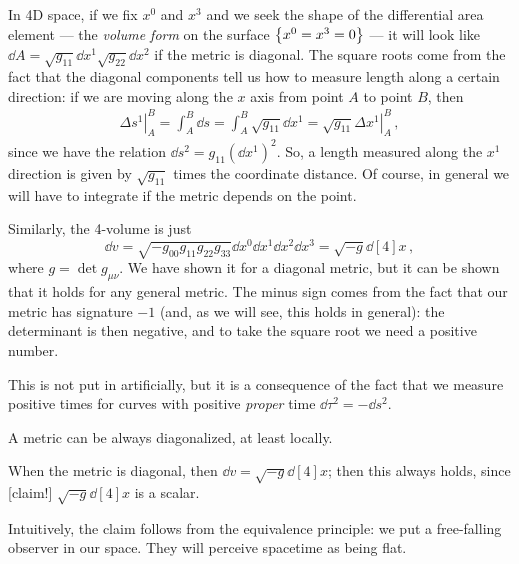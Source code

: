 \documentclass[main.tex]{subfiles}
\begin{document}
In 4D space, if we fix \(x^{0}\) and \(x^{3}\) and we seek the shape of the differential area element --- the \emph{volume form}  on  the surface \(\qty{x^{0} = x^{3}=0}\) --- it will look like \(\dd{A} = \sqrt{g_{11}} \dd{x^{1}} \sqrt{g_{22}} \dd{x^{2}} \) if the metric is diagonal. 
The square roots come from the fact that the diagonal components tell us how to measure length along a certain direction: if we  are moving along the \(x\) axis from point \(A\) to point \(B\), then
%
\begin{align}
\left. \Delta s^{1} \right\vert_{A}^{B} = \int_{A}^{B} \dd{s} = \int_{A}^{B} \sqrt{g_{11}} \dd{x^{1}} = \sqrt{g_{11} }  \left. \Delta x^{1} \right\vert_{A}^{B}
\,,
\end{align}
%
since we have the relation \(\dd{s^2} = g_{11} (\dd{x^{1}})^2\). 
So, a length measured along the \(x^{1}\) direction is given by \(\sqrt{g_{11} }\) times the coordinate distance. Of course, in general we will have to integrate if the metric depends on the point.

Similarly, the 4-volume is just 
%
\begin{equation}
  \dd{v} 
  = \sqrt{-g_{00}g_{11}g_{22}g_{33}}
  \dd{x^{0}} \dd{x^{1}} \dd{x^{2}} \dd{x^{3}} 
  = \sqrt{-g}
  \dd[4]{x} 
\,,
\end{equation}
%
where \(g = \det g_{\mu \nu }\). We have shown it for a diagonal metric, but it can be shown that it holds for any general metric. The minus sign comes from the fact that our metric has signature \(-1\) (and, as we will see, this holds in general): the determinant is then negative, and to take the square root we need a positive number.

This is not put in artificially, but it is a consequence of the fact that we measure positive times for curves with positive \emph{proper} time \(\dd{\tau^2} = - \dd{s^2}\).  

\begin{claim}[Unproven]
    A metric can be always diagonalized, at least locally.
\end{claim}

When the metric is diagonal, then \(\dd{v} = \sqrt{-g} \dd[4]{x} \); then this always holds, since [claim!] \(\sqrt{-g} \dd[4]{x} \) is a scalar.

Intuitively, the claim follows from the equivalence principle: we put a free-falling observer in our space. They will perceive spacetime as being flat.
\end{document}
